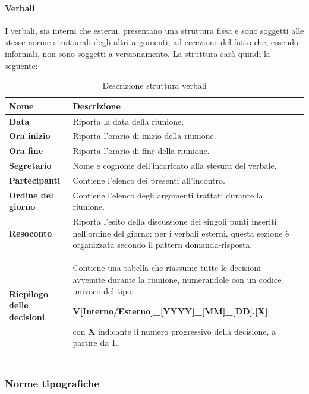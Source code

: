 {\paragraph*{Verbali}      
I verbali, sia interni che esterni, presentano una struttura fissa e sono soggetti alle stesse norme strutturali degli altri argomenti, ad eccezione del fatto che, essendo informali, non sono soggetti a versionamento.
La struttura sarà quindi la seguente:

	\setlength{\freewidth}{\dimexpr\textwidth-1\tabcolsep}
	\renewcommand{\arraystretch}{1.5}
	\setlength{\aboverulesep}{0pt}
	\setlength{\belowrulesep}{0pt}
	\begin{longtable}{L{.210\freewidth} L{.6\freewidth} L{.080\freewidth}}
		\textbf{Nome} & \textbf{Descrizione} \\
		\toprule
		\endhead		
		\textbf{Data} & Riporta la data della riunione. \\
		\textbf{Ora inizio} & Riporta l'orario di inizio della riunione.\\
		
		\textbf{Ora fine} & Riporta l'orario di fine della riunione. \\
		\textbf{Segretario} & Nome e cognome dell'incaricato alla stesura del verbale. \\
		\textbf{Partecipanti} & Contiene l'elenco dei presenti all'incontro. \\  
		\textbf{Ordine del giorno} & Contiene l'elenco degli argomenti trattati durante la riunione. \\
		\textbf{Resoconto} & Riporta l'esito della discussione dei singoli punti inseriti nell'ordine del giorno; per i verbali esterni, questa sezione è organizzata secondo il pattern domanda-risposta. \\
		\textbf{Riepilogo delle decisioni} & Contiene una tabella che riassume tutte le decisioni avvenute durante la riunione, numerandole con un codice univoco del tipo: 
	\centerline{\textbf{V[Interno/Esterno]\_[YYYY]\_[MM]\_[DD].[X]}} con \textbf{X} indicante il numero progressivo della decisione, a partire da 1. \\		
		
		\bottomrule
		\hiderowcolors
		\caption{Descrizione struttura verbali}
	\end{longtable}

\subsubsection*{Norme tipografiche}
}
